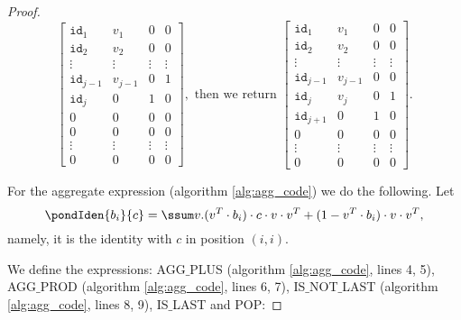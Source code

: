 \begin{proof}
\[
\begin{bmatrix}
    \texttt{id}_1 & v_1 & 0 & 0 \\
    \texttt{id}_2 & v_2 & 0 & 0 \\
    \vdots & \vdots & \vdots & \vdots \\
    \texttt{id}_{j-1} & v_{j-1} & 0 & 1 \\
    \texttt{id}_j & 0 & 1 & 0 \\
    0 & 0 & 0 & 0 \\
    0 & 0 & 0 & 0 \\
    \vdots & \vdots & \vdots & \vdots \\
     0 & 0 & 0 & 0
\end{bmatrix}, \text{ then we return }
\begin{bmatrix}
    \texttt{id}_1 & v_1 & 0 & 0 \\
    \texttt{id}_2 & v_2 & 0 & 0 \\
    \vdots & \vdots & \vdots & \vdots \\
    \texttt{id}_{j-1} & v_{j-1} & 0 & 0 \\
    \texttt{id}_j & v_j & 0 & 1 \\
    \texttt{id}_{j+1} & 0 & 1 & 0 \\
    0 & 0 & 0 & 0 \\
    \vdots & \vdots & \vdots & \vdots \\
     0 & 0 & 0 & 0
\end{bmatrix}.
\]


For the aggregate expression (algorithm \ref{alg:agg_code}) we do the following. Let $$\pondIden{b_i}{c}=\ssum v. (v^T\cdot b_i)\cdot c\cdot v\cdot v^T + (1-v^T\cdot b_i)\cdot v \cdot v^T,$$ namely, it is the identity with $c$ in position $(i,i)$.

We define the expressions: AGG${\_}$PLUS (algorithm \ref{alg:agg_code}, lines 4, 5), AGG${\_}$PROD (algorithm \ref{alg:agg_code}, lines 6, 7),  IS${\_}$NOT${\_}$LAST (algorithm \ref{alg:agg_code}, lines 8, 9), IS${\_}$LAST and POP:


\end{proof}
